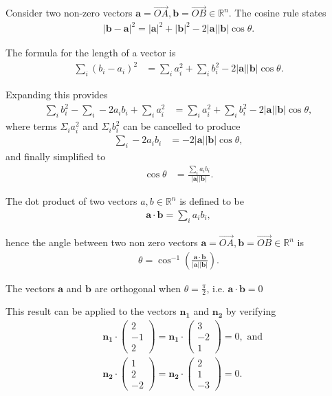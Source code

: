 \documentclass{amsart}
\renewcommand{\vec}{\mathbf}
\newcommand{\cvec}[1]{ \begin{pmatrix} #1 \end{pmatrix} }
\begin{document}
\begin{enumerate}[(a)]
\begin{enumerate}[(i)]
				Consider two non-zero vectors $\vec{a} = \overrightarrow{OA}, \vec{b} = \overrightarrow{OB} \in \mathbb{R}^n$. The cosine rule states
					\begin{align*}
						|\vec{b} - \vec{a}|^2 = |\vec{a}|^2 + |\vec{b}|^2 - 2|\vec{a}||\vec{b}|\cos\theta.
					\end{align*}

				The formula for the length of a vector is
					\begin{align*}
						\sum_i (b_i - a_i)^2 &= \sum_i a_i^2 + \sum_i b_i^2 - 2|\mathbf{a}||\mathbf{b}| \cos\theta.
					\end{align*}

				Expanding this provides
					\begin{align*}
						\sum_i b_i^2 - \sum_i -2a_i b_i + \sum_i a_i^2 &= \sum_i a_i^2 + \sum_i b_i^2 - 2|\mathbf{a}||\mathbf{b}| \cos\theta,
					\end{align*}
				where terms $\displaystyle\Sigma_i a_i^2$ and $\displaystyle\Sigma_i b_i^2$ can be cancelled to produce
					\begin{align*}
						\sum_i -2a_i b_i &= -2|\vec{a}||\vec{b}|\cos\theta,
					\end{align*}
				and finally simplified to
					\begin{align*}
						\cos\theta &= \frac{\displaystyle\sum_i a_i b_i}{|\vec{a}||\vec{b}|}.
					\end{align*}

				The dot product of two vectors $a,b \in \mathbb{R}^n$ is defined to be
					\begin{align*}
						\vec{a} \cdot \vec{b} = \sum_i a_i b_i,
					\end{align*}

				hence the angle between two non zero vectors $\vec{a} = \overrightarrow{OA}, \vec{b} = \overrightarrow{OB} \in \mathbb{R}^n$ is
					\begin{align*}
						\theta = \cos^{-1} \left(\frac{\vec{a} \cdot \vec{b}}{|\vec{a}||\vec{b}|}\right).
					\end{align*}

				The vectors $\vec{a}$ and $\vec{b}$ are orthogonal when $\theta = \frac{\pi}{2}$, i.e. $\vec{a} \cdot \vec{b} = 0$

				This result can be applied to the vectors $\vec{n_1}$ and $\vec{n_2}$ by verifying
				\begin{align*}
					& \vec{n_1} \cdot \cvec{2\\-1\\2} = \vec{n_1} \cdot \cvec{3\\-2\\1} = 0, \text{ and}	\\
					& \vec{n_2} \cdot \cvec{1\\2\\-2} = \vec{n_2} \cdot \cvec{2\\1\\-3} = 0.
				\end{align*}
				\\


\end{enumerate}
\end{enumerate}
\end{document}

